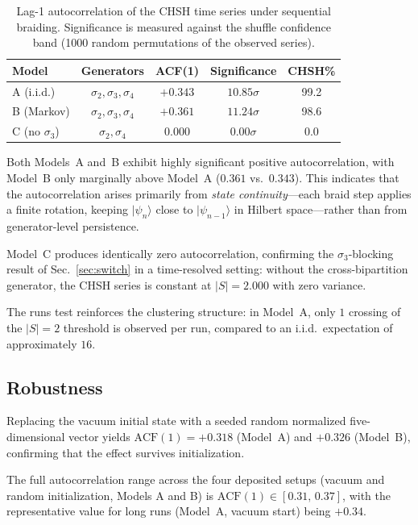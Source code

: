 \documentclass[aps,pra,twocolumn,superscriptaddress,longbibliography,floatfix,nofootinbib]{revtex4-2}
\begin{document}
\begin{table}[!htb]
\caption{%
Lag-1 autocorrelation of the CHSH time series under sequential
braiding.
Significance is measured against the shuffle confidence band
(1000 random permutations of the observed series).
}
\label{tab:acf}
\begin{ruledtabular}
\begin{tabular}{lcccc}
Model & Generators & ACF(1) & Significance & CHSH\% \\
\hline
A (i.i.d.) & $\sigma_2,\sigma_3,\sigma_4$ & $+0.343$ & $10.85\sigma$ & 99.2 \\
B (Markov) & $\sigma_2,\sigma_3,\sigma_4$ & $+0.361$ & $11.24\sigma$ & 98.6 \\
C (no $\sigma_3$) & $\sigma_2,\sigma_4$ & $0.000$ & $0.00\sigma$ & 0.0 \\
\end{tabular}
\end{ruledtabular}
\end{table}

Both Models~A and~B exhibit highly significant positive autocorrelation,
with Model~B only marginally above Model~A ($0.361$ vs.\ $0.343$).
This indicates that the autocorrelation arises primarily from
\emph{state continuity}---each braid step applies a finite rotation,
keeping $|\psi_n\rangle$ close to $|\psi_{n-1}\rangle$ in Hilbert
space---rather than from generator-level persistence.

Model~C produces identically zero autocorrelation, confirming
the $\sigma_3$-blocking result of Sec.~\ref{sec:switch} in a
time-resolved setting: without the cross-bipartition generator,
the CHSH series is constant at $|S|=2.000$ with zero variance.

The runs test reinforces the clustering structure: in Model~A,
only $1$ crossing of the $|S|=2$ threshold is observed per run,
compared to an i.i.d.\ expectation of approximately $16$.

\subsection{Robustness}

Replacing the vacuum initial state with a seeded random normalized
five-dimensional vector yields $\text{ACF}(1)=+0.318$ (Model~A) and
$+0.326$ (Model~B), confirming that the effect survives
initialization.

The full autocorrelation range across the four deposited setups
(vacuum and random initialization, Models A and B) is
$\text{ACF}(1)\in [0.31,\,0.37]$, with the representative value
for long runs (Model~A, vacuum start) being $+0.34$.
\end{document}
